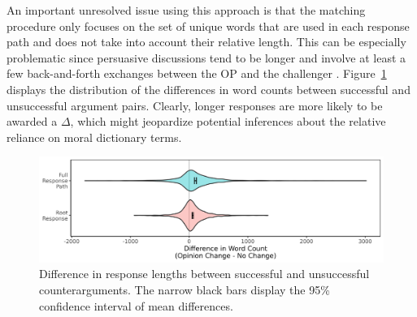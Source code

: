 An important unresolved issue using this approach is that the matching procedure only focuses on the set of unique words that are used in each response path and does not take into account their relative length. This can be especially problematic since persuasive discussions tend to be longer and involve at least a few back-and-forth exchanges between the OP and the challenger \citep[c.f.,][616]{tan2016winning}. Figure~\ref{fig:wordcount_violin} displays the distribution of the differences in word counts between successful and unsuccessful argument pairs. Clearly, longer responses are more likely to be awarded a $\Delta$, which might jeopardize potential inferences about the relative reliance on moral dictionary terms.

\begin{figure}[ht]
\centering
\includegraphics{fig5-wordcount_violin_political.png}
\caption[Difference in response lengths between successful and unsuccessful counterarguments]{Difference in response lengths between successful and unsuccessful counterarguments. The narrow black bars display the 95\% confidence interval of mean differences.}\label{fig:wordcount_violin}
\end{figure}

